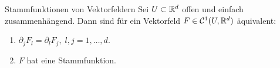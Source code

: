 \documentclass[main.tex]{subfiles}
\begin{document}
\begin{karte}{Stammfunktionen von Vektorfeldern}
    Sei \( U \subset \mathbb{R}^d \) offen und einfach zusammenhängend. 
    Dann sind für ein Vektorfeld 
    \( F \in \mathcal{C}^1(U, \mathbb{R}^d) \) äquivalent:
    \begin{enumerate}
        \item \( \partial_j F_l = \partial_l F_j,\; l,j = 1,\ldots, d \).
        \item \( F \) hat eine Stammfunktion.
    \end{enumerate}
\end{karte}
\end{document}
